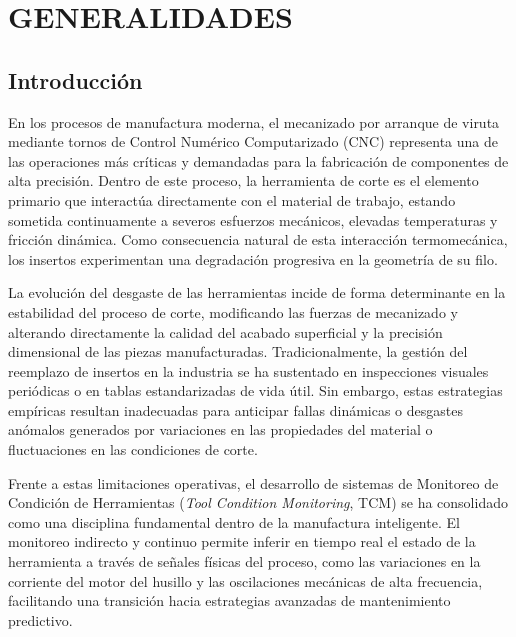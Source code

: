 
\newpage
\section{GENERALIDADES}
\label{sec:generalidades}

\subsection{Introducción}
\label{subsec:introduccion}

En los procesos de manufactura moderna, el mecanizado por arranque de viruta mediante tornos de Control Numérico Computarizado (CNC) representa una de las operaciones más críticas y demandadas para la fabricación de componentes de alta precisión. Dentro de este proceso, la herramienta de corte es el elemento primario que interactúa directamente con el material de trabajo, estando sometida continuamente a severos esfuerzos mecánicos, elevadas temperaturas y fricción dinámica. Como consecuencia natural de esta interacción termomecánica, los insertos experimentan una degradación progresiva en la geometría de su filo.

La evolución del desgaste de las herramientas incide de forma determinante en la estabilidad del proceso de corte, modificando las fuerzas de mecanizado y alterando directamente la calidad del acabado superficial y la precisión dimensional de las piezas manufacturadas. Tradicionalmente, la gestión del reemplazo de insertos en la industria se ha sustentado en inspecciones visuales periódicas o en tablas estandarizadas de vida útil. Sin embargo, estas estrategias empíricas resultan inadecuadas para anticipar fallas dinámicas o desgastes anómalos generados por variaciones en las propiedades del material o fluctuaciones en las condiciones de corte.

Frente a estas limitaciones operativas, el desarrollo de sistemas de Monitoreo de Condición de Herramientas (\textit{Tool Condition Monitoring}, TCM) se ha consolidado como una disciplina fundamental dentro de la manufactura inteligente. El monitoreo indirecto y continuo permite inferir en tiempo real el estado de la herramienta a través de señales físicas del proceso, como las variaciones en la corriente del motor del husillo y las oscilaciones mecánicas de alta frecuencia, facilitando una transición hacia estrategias avanzadas de mantenimiento predictivo.

